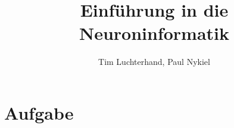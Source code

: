 \documentclass[DIN, pagenumber=false, fontsize=11pt, parskip=half]{scrartcl}
\title{Einführung in die Neuroninformatik}
\author{Tim Luchterhand, Paul Nykiel}
\begin{document}
    \maketitle
    \section{Aufgabe}
\end{document}
